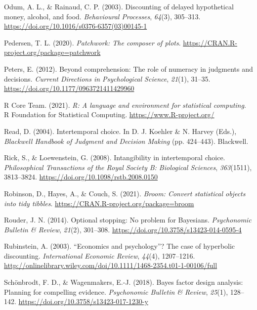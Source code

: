 \documentclass[
  pub,floatsintext]{apa6}
\newlength{\cslhangindent}
\newlength{\cslentryspacingunit} %
\newenvironment{CSLReferences}[2] %
 {%
  \setlength{\parindent}{0pt}
  \ifodd #1
  \let\oldpar\par
  \def\par{\hangindent=\cslhangindent\oldpar}
  \fi
  \setlength{\parskip}{#2\cslentryspacingunit}
 }%
 {}
\begin{document}
\begin{CSLReferences}{1}{0}
\leavevmode{}%
Odum, A. L., \& Rainaud, C. P. (2003). Discounting of delayed hypothetical money, alcohol, and food. \emph{Behavioural Processes}, \emph{64}(3), 305--313. \url{https://doi.org/10.1016/s0376-6357(03)00145-1}

\leavevmode{}%
Pedersen, T. L. (2020). \emph{Patchwork: The composer of plots}. \url{https://CRAN.R-project.org/package=patchwork}

\leavevmode{}%
Peters, E. (2012). Beyond comprehension: {The} role of numeracy in judgments and decisions. \emph{Current Directions in Psychological Science}, \emph{21}(1), 31--35. \url{https://doi.org/10.1177/0963721411429960}

\leavevmode{}%
R Core Team. (2021). \emph{R: A language and environment for statistical computing}. R Foundation for Statistical Computing. \url{https://www.R-project.org/}

\leavevmode{}%
Read, D. (2004). Intertemporal choice. In D. J. Koehler \& N. Harvey (Eds.), \emph{Blackwell {Handbook} of {Judgment} and {Decision} {Making}} (pp. 424--443). Blackwell.

\leavevmode{}%
Rick, S., \& Loewenstein, G. (2008). Intangibility in intertemporal choice. \emph{Philosophical Transactions of the Royal Society B: Biological Sciences}, \emph{363}(1511), 3813--3824. \url{https://doi.org/10.1098/rstb.2008.0150}

\leavevmode{}%
Robinson, D., Hayes, A., \& Couch, S. (2021). \emph{Broom: Convert statistical objects into tidy tibbles}. \url{https://CRAN.R-project.org/package=broom}

\leavevmode{}%
Rouder, J. N. (2014). Optional stopping: {No} problem for {Bayesians}. \emph{Psychonomic Bulletin \& Review}, \emph{21}(2), 301--308. \url{https://doi.org/10.3758/s13423-014-0595-4}

\leavevmode{}%
Rubinstein, A. (2003). {``{Economics} and psychology''}? {The} case of hyperbolic discounting. \emph{International Economic Review}, \emph{44}(4), 1207--1216. \url{http://onlinelibrary.wiley.com/doi/10.1111/1468-2354.t01-1-00106/full}

\leavevmode{}%
Schönbrodt, F. D., \& Wagenmakers, E.-J. (2018). Bayes factor design analysis: {Planning} for compelling evidence. \emph{Psychonomic Bulletin \& Review}, \emph{25}(1), 128--142. \url{https://doi.org/10.3758/s13423-017-1230-y}


\end{CSLReferences}
\end{document}
